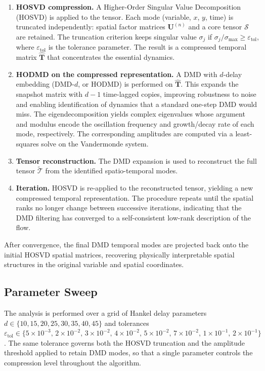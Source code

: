 \begin{enumerate}
    \item \textbf{HOSVD compression.} A Higher-Order Singular Value Decomposition (HOSVD) is applied to the tensor. Each mode (variable, $x$, $y$, time) is truncated independently: spatial factor matrices $\mathbf{U}^{(n)}$ and a core tensor $\mathcal{S}$ are retained. The truncation criterion keeps singular value $\sigma_j$ if $\sigma_j / \sigma_\mathrm{max} \geq \varepsilon_\mathrm{tol}$, where $\varepsilon_\mathrm{tol}$ is the tolerance parameter. The result is a compressed temporal matrix $\hat{\mathbf{T}}$ that concentrates the essential dynamics.

    \item \textbf{HODMD on the compressed representation.} A DMD with $d$-delay embedding (DMD-$d$, or HODMD) is performed on $\hat{\mathbf{T}}$. This expands the snapshot matrix with $d-1$ time-lagged copies, improving robustness to noise and enabling identification of dynamics that a standard one-step DMD would miss. The eigendecomposition yields complex eigenvalues whose argument and modulus encode the oscillation frequency and growth/decay rate of each mode, respectively. The corresponding amplitudes are computed via a least-squares solve on the Vandermonde system.

    \item \textbf{Tensor reconstruction.} The DMD expansion is used to reconstruct the full tensor $\tilde{\mathcal{T}}$ from the identified spatio-temporal modes.

    \item \textbf{Iteration.} HOSVD is re-applied to the reconstructed tensor, yielding a new compressed temporal representation. The procedure repeats until the spatial ranks no longer change between successive iterations, indicating that the DMD filtering has converged to a self-consistent low-rank description of the flow.
\end{enumerate}

After convergence, the final DMD temporal modes are projected back onto the initial HOSVD spatial matrices, recovering physically interpretable spatial structures in the original variable and spatial coordinates.

\subsection{Parameter Sweep}

The analysis is performed over a grid of Hankel delay parameters $d \in \{10, 15, 20, 25, 30, 35, 40, 45\}$ and tolerances $\varepsilon_\mathrm{tol} \in \{5\times10^{-3},\, 2\times10^{-2},\, 3\times10^{-2},\, 4\times10^{-2},\, 5\times10^{-2},\, 7\times10^{-2},\, 1\times10^{-1},\, 2\times10^{-1}\}$. The same tolerance governs both the HOSVD truncation and the amplitude threshold applied to retain DMD modes, so that a single parameter controls the compression level throughout the algorithm.

